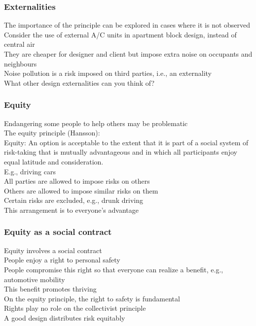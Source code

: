 \documentclass{article}
\begin{document}
\subsubsection*{Externalities}
\label{ssub:externalities}


The importance of the principle can be explored in cases where it is not observed\\
Consider the use of external A/C units in apartment block design, instead of central air\\
They are cheaper for designer and client but impose extra noise on occupants and neighbours\\
Noise pollution is a risk imposed on third parties, i.e., an externality\\
{What other design externalities can you think of?}


\subsubsection*{Equity}
\label{ssub:equity}


Endangering some people to help others may be problematic\\
The equity principle (Hansson):\\
Equity: An option is acceptable to the extent that it is part of a social system of risk-taking that is mutually advantageous and in which all participants enjoy equal latitude and consideration.\\
E.g., driving cars\\
All parties are allowed to impose risks on others\\
Others are allowed to impose similar risks on them\\
Certain risks are excluded, e.g., drunk driving\\
This arrangement is to everyone’s advantage\\
\subsubsection*{Equity as a social contract}
\label{ssub:equity_as_a_social_contract}


Equity involves a social contract\\
People enjoy a right to personal safety\\
People compromise this right so that everyone can realize a benefit, e.g., automotive mobility\\
This benefit promotes thriving\\
On the equity principle, the right to safety is fundamental\\
Rights play no role on the collectivist principle\\
A good design distributes risk equitably\\
\end{document}
